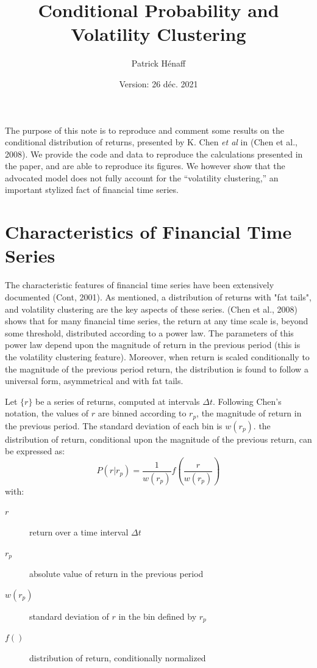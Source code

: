 \documentclass[
  11pt,
]{article}
\title{Conditional Probability and Volatility Clustering}
\author{Patrick Hénaff}
\date{Version: 26 déc. 2021}
\begin{document}
\maketitle

The purpose of this note is to reproduce and comment some results on the
conditional distribution of returns, presented by K. Chen \emph{et al}
in (Chen et al., 2008). We provide the code and data to reproduce the
calculations presented in the paper, and are able to reproduce its
figures. We however show that the advocated model does not fully account
for the ``volatility clustering,'' an important stylized fact of
financial time series.

\hypertarget{sec:fts}{%
\section{Characteristics of Financial Time Series}\label{sec:fts}}

The characteristic features of financial time series have been
extensively documented (Cont, 2001). As mentioned, a distribution of
returns with "fat tails", and volatility clustering are the key aspects
of these series. (Chen et al., 2008) shows that for many financial time
series, the return at any time scale is, beyond some threshold,
distributed according to a power law. The parameters of this power law
depend upon the magnitude of return in the previous period (this is the
volatility clustering feature). Moreover, when return is scaled
conditionally to the magnitude of the previous period return, the
distribution is found to follow a universal form, asymmetrical and with
fat tails.

Let \(\{r\}\) be a series of returns, computed at intervals
\(\Delta t\). Following Chen's notation, the values of \(r\) are binned
according to \(r_p\), the magnitude of return in the previous period.
The standard deviation of each bin is \(w(r_p)\). the distribution of
return, conditional upon the magnitude of the previous return, can be
expressed as: \begin{equation}
P(r | r_p) = \frac{1}{w(r_p)} f \left( \frac{r}{w(r_p)} \right)
\label{eq:cond-dist}
\end{equation} with:

\begin{description}
\item[\(r\)]
return over a time interval \(\Delta t\)
\item[\(r_p\)]
absolute value of return in the previous period
\item[\(w(r_p)\)]
standard deviation of \(r\) in the bin defined by \(r_p\)
\item[\(f()\)]
distribution of return, conditionally normalized
\end{description}
\end{document}
